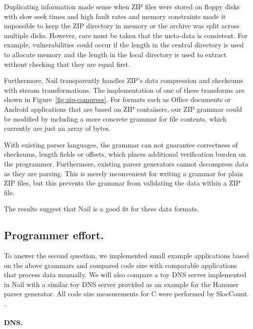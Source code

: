 Duplicating information made sense when ZIP files were
stored on floppy disks with slow seek times and high fault rates and memory constraints made it
impossible to keep the ZIP directory in memory or the archive was split across multiple disks.
However, care must be taken that the meta-data is consistent. For example, vulnerabilities could occur
if the length in the central directory is used to allocate memory and the length in the local
directory is used to extract without checking that they are equal first. 


Furthermore, Nail transparently handles ZIP's data compression and checksums with stream
transformations. The implementation of one of these transforms are shown in
Figure~\ref{fig:zip-compress}. For formats such as Office documents or Android applications that are based on ZIP
containers, our ZIP grammar could be modified by including a more concrete grammar for file
contents, which currently are just an array of bytes.

With existing parser languages, the grammar can not guarantee correctness of checksums, length
fields or offsets, which places additional verification burden on the programmer. Furthermore,
existing parser generators cannot decompress data as they are parsing. This is merely inconvenient
for writing a grammar for plain ZIP files, but this prevents the grammar from validating the data
within a ZIP file.


The results suggest that Nail is a good fit for these data formats. 



\subsection{Programmer effort.}


\label{s:eval-effort}
To answer the second question, we implemented small example applications based on the above
grammars and compared code size with comparable applications that process data manually. We will
also compare a toy DNS server implemented in Nail with a similar toy DNS server provided as an
example for the Hammer parser generator. All code size measurements for C were performed by
SlocCount\cite{sloccount}. .


\paragraph{DNS.}

